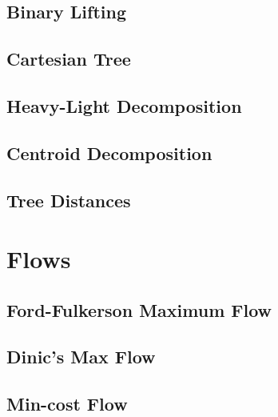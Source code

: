 \documentclass[10pt]{article}
\begin{document}
\begin{multicols*}{2}
\subsection{Binary Lifting}


\subsection{Cartesian Tree}


\subsection{Heavy-Light Decomposition}


\subsection{Centroid Decomposition}


\subsection{Tree Distances}



\section{Flows}

\subsection{Ford-Fulkerson Maximum Flow}


\subsection{Dinic's Max Flow}


\subsection{Min-cost Flow}



\end{multicols*}
\end{document}
